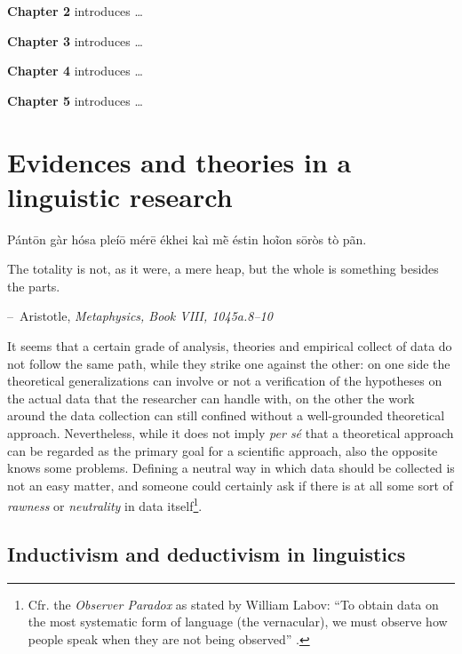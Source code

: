\documentclass[
  a4paper,
  twoside,
  12pt,
  chapterprefix=false,
  bibliography=totocnumbered,
  listof=flat]{scrbook}
\makeatletter
\newenvironment{chapquote}[2][2em]
  {\setlength{\@tempdima}{#1}%
   \def\chapquote@author{#2}%
   \parshape 1 \@tempdima \dimexpr\textwidth-2\@tempdima\relax%
   \itshape}
  {\par\normalfont\hfill--\ \chapquote@author\hspace*{\@tempdima}\par\vspace{4em}}
\makeatother
\begin{document}
\textbf{Chapter 2} introduces \ldots{}

\textbf{Chapter 3} introduces \ldots{}

\textbf{Chapter 4} introduces \ldots{}

\textbf{Chapter 5} introduces \ldots{}

\hypertarget{evidences-and-theories-in-a-linguistic-research}{%
\chapter{Evidences and theories in a linguistic research}\label{evidences-and-theories-in-a-linguistic-research}}

\begin{chapquote}{Aristotle, \textit{Metaphysics, Book VIII, 1045a.8–10}}
\par{Pántōn gàr hósa pleíō mérē ékhei kaì mḕ éstin hoĩon sōròs tò pãn.}\\ 
\par{\noindent The totality is not, as it were, a mere heap, but the whole is something besides the parts.}
\end{chapquote}

\noindent It seems that a certain grade of analysis, theories and empirical collect of data do not follow the same path, while they strike one against the other: on one side the theoretical generalizations can involve or not a verification of the hypotheses on the actual data that the researcher can handle with, on the other the work around the data collection can still confined without a well-grounded theoretical approach.
Nevertheless, while it does not imply \emph{per sé} that a theoretical approach can be regarded as the primary goal for a scientific approach, also the opposite knows some problems. Defining a neutral way in which data should be collected is not an easy matter, and someone could certainly ask if there is at all some sort of \emph{rawness} or \emph{neutrality} in data itself\footnote{Cfr. the \emph{Observer Paradox} as stated by William Labov: ``To obtain data on the most systematic form of language (the vernacular), we must observe how people speak when they are not being observed'' \citep[xvii]{labov1973}.}.

\hypertarget{inductivism-and-deductivism-in-linguistics}{%
\section{Inductivism and deductivism in linguistics}\label{inductivism-and-deductivism-in-linguistics}}
\end{document}
